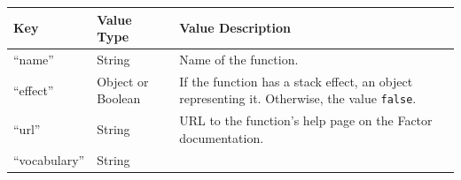 \documentclass[
]{article}
\begin{document}
\begin{longtable}[]{@{}lll@{}}
\toprule
\begin{minipage}[b]{0.13\columnwidth}\raggedright
Key\strut
\end{minipage} & \begin{minipage}[b]{0.14\columnwidth}\raggedright
Value Type\strut
\end{minipage} & \begin{minipage}[b]{0.64\columnwidth}\raggedright
Value Description\strut
\end{minipage}\tabularnewline
\midrule
\endhead
\begin{minipage}[t]{0.13\columnwidth}\raggedright
``name''\strut
\end{minipage} & \begin{minipage}[t]{0.14\columnwidth}\raggedright
String\strut
\end{minipage} & \begin{minipage}[t]{0.64\columnwidth}\raggedright
Name of the function.\strut
\end{minipage}\tabularnewline
\begin{minipage}[t]{0.13\columnwidth}\raggedright
``effect''\strut
\end{minipage} & \begin{minipage}[t]{0.14\columnwidth}\raggedright
Object or Boolean\strut
\end{minipage} & \begin{minipage}[t]{0.64\columnwidth}\raggedright
If the function has a stack effect, an object representing it.
Otherwise, the value \texttt{false}.\strut
\end{minipage}\tabularnewline
\begin{minipage}[t]{0.13\columnwidth}\raggedright
``url''\strut
\end{minipage} & \begin{minipage}[t]{0.14\columnwidth}\raggedright
String\strut
\end{minipage} & \begin{minipage}[t]{0.64\columnwidth}\raggedright
URL to the function's help page on the Factor documentation.\strut
\end{minipage}\tabularnewline
\begin{minipage}[t]{0.13\columnwidth}\raggedright
``vocabulary''\strut
\end{minipage} & \begin{minipage}[t]{0.14\columnwidth}\raggedright
String\strut
\end{minipage} & \begin{minipage}[t]{0.64\columnwidth}\raggedright

\end{minipage}
\end{longtable}
\end{document}
